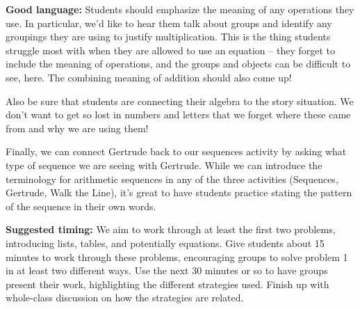 \documentclass[noauthor,nooutcomes,handout]{ximera}
\begin{document}
\begin{instructorNotes}
{\bf Good language:} Students should emphasize the meaning of any operations they use. In particular, we'd like to hear them talk about groups and identify any groupings they are using to justify multiplication. This is the thing students struggle most with when they are allowed to use an equation -- they forget to include the meaning of operations, and the groups and objects can be difficult to see, here. The combining meaning of addition should also come up!

Also be sure that students are connecting their algebra to the story situation. We don't want to get so lost in numbers and letters that we forget where these came from and why we are using them!

Finally, we can connect Gertrude back to our sequences activity by asking what type of sequence we are seeing with Gertrude. While we can introduce the terminology for arithmetic sequences in any of the three activities (Sequences, Gertrude, Walk the Line), it's great to have students practice stating the pattern of the sequence in their own words.

{\bf Suggested timing:} We aim to work through at least the first two problems, introducing lists, tables, and potentially equations. Give students about 15 minutes to work through these problems, encouraging groups to solve problem 1 in at least two different ways.
Use the next 30 minutes or so to have groups present their work, highlighting the different strategies used. Finish up with whole-class discussion on how the strategies are related.


\end{instructorNotes}
\end{document}
